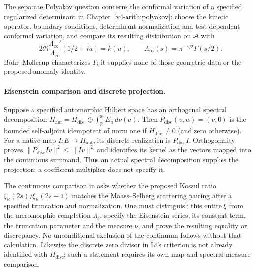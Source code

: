 The separate Polyakov question concerns the conformal variation of
a specified regularized determinant in Chapter~\ref{v4-arith:polyakov}:
choose the kinetic operator, boundary conditions, determinant
normalization and test-dependent conformal variation, and compare
its resulting distribution on $\mathscr A$ with
\[
 -2\Re\frac{\Lambda_\infty'}{\Lambda_\infty}(1/2+iu)=k(u),
 \qquad \Lambda_\infty(s)=\pi^{-s/2}\Gamma(s/2).
\]
Bohr--Mollerup characterizes $\Gamma$; it supplies none of those
geometric data or the proposed anomaly identity.

\paragraph{Eisenstein comparison and discrete projection.}
\label{v4-arith:pres57:discrete-projection}
Suppose a specified automorphic Hilbert space has an orthogonal
spectral decomposition
$H_{\mathrm{aut}}=H_{\mathrm{disc}}\oplus
 \int_{\mathbb R}^{\oplus}E_u\,d\nu(u)$.
Then $P_{\mathrm{disc}}(v,w)=(v,0)$ is the bounded self-adjoint
idempotent of norm one if $H_{\mathrm{disc}}\ne0$ (and zero otherwise).
For a native map $I:E\to H_{\mathrm{aut}}$, its discrete realization
is $P_{\mathrm{disc}}I$. Orthogonality proves
$\|P_{\mathrm{disc}}Iv\|^2\le\|Iv\|^2$ and identifies its kernel
as the vectors mapped into the continuous summand. Thus an actual
spectral decomposition supplies the projection; a coefficient
multiplier does not specify it.

The continuous comparison in
 asks whether the proposed
Koszul ratio $\xi_{\mathbb R}(2s)/\xi_{\mathbb R}(2s-1)$ matches the
Maass--Selberg scattering pairing after a specified truncation and
normalization. One must distinguish this entire $\xi$ from the
meromorphic completion $\Lambda_\zeta$, specify the Eisenstein series,
its constant term, the truncation parameter and the measure $\nu$,
and prove the resulting equality or discrepancy. No unconditional
exclusion of the continuum follows without that calculation.
Likewise the discrete zero divisor in Li's criterion is not already
identified with $H_{\mathrm{disc}}$; such a statement requires its own
map and spectral-measure comparison.

